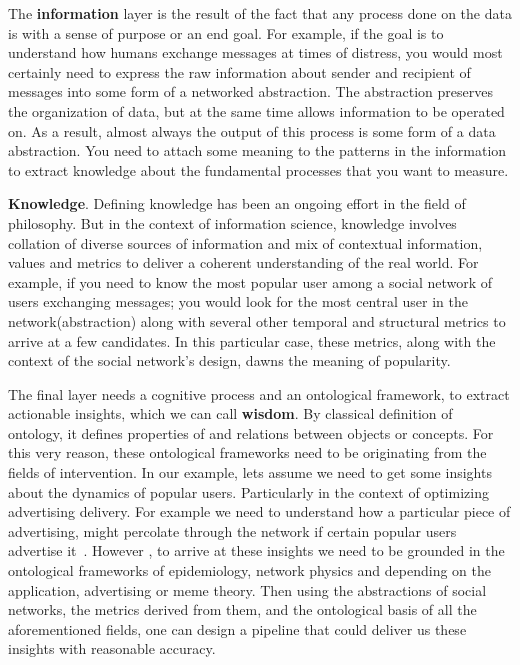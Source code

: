 The \textbf{information} layer is the result of the fact that any process done on the data is with a sense of purpose or an end goal. For example, if the goal is to understand how humans exchange messages at times of distress, you would most certainly need to express the raw information about sender and recipient of messages into some form of a networked abstraction. The abstraction preserves the organization of data, but at the same time allows information to be operated on. As a result, almost always the output of this process is some form of a data abstraction. You need to attach some meaning to the patterns in the information to extract knowledge about the fundamental processes that you want to measure.

\textbf{Knowledge}. Defining knowledge has been an ongoing effort in the field of philosophy. But in the context of information science, knowledge involves collation of diverse sources of information and  mix of contextual information, values and metrics to deliver a coherent understanding of the real world. For example, if you need to know the most popular user among a social network of users exchanging messages; you would look for the most central user in the network(abstraction) along with several other temporal and structural metrics to arrive at a few candidates. In this particular case, these metrics, along with the context of the social network's design, dawns the meaning of popularity. 

The final layer needs a cognitive process and an ontological framework, to extract actionable insights, which we can call \textbf{wisdom}. By classical definition of ontology, it defines properties of and relations between objects or concepts. For this very reason, these ontological frameworks need to be originating from the fields of intervention.  In our example, lets assume we need to get some insights about the dynamics of popular users. Particularly in the context of optimizing advertising delivery. For example we need to understand how a particular piece of advertising, might percolate through the network if certain popular users advertise it~\cite{li2012diffusion}. However , to arrive at these insights we need to be grounded in the ontological frameworks of epidemiology, network physics and depending on the application, advertising or meme theory. Then using the abstractions of social networks, the metrics derived from them, and the ontological basis of all the aforementioned fields, one can design a pipeline that could deliver us these insights with reasonable accuracy. 

